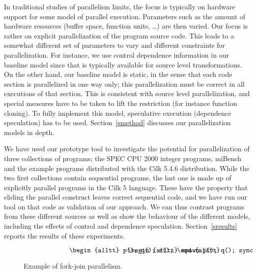 In traditional studies of parallelism limits, the focus is typically
on hardware support for some model of parallel execution. Parameters
such as the amount of hardware resources (buffer space, function
units, \ldots) are then varied. Our focus is rather on explicit
parallelization of the program source code. This leads to a somewhat
different set of parameters to vary and different constraints for
parallelization. For instance, we use control dependence information
in our baseline model since that is typically available for source
level transformations. On the other hand, our baseline model is
static, in the sense that each code section is parallelized in one way
only; this parallelization must be correct in all executions of that
section. This is consistent with source level parallelization, and
special measures have to be taken to lift the restriction (for
instance function cloning). To fully implement this model, speculative 
execution (dependence speculation) has to be used. Section~\ref{smethod} 
discusses our parallelization models in depth.

We have used our prototype tool to investigate the potential for 
parallelization of three collections of programs; the SPEC CPU 2000 
integer programs, miBench and the example programs distributed with
the Cilk 5.4.6 distribution. While the two first collections contain
sequential programs, the last one is made up of explicitly parallel 
programs in the Cilk 5 language. These have the property that eliding
the parallel construct leaves correct sequential code, and we have run 
our tool on that code as validation of our approach. We can thus contrast 
programs from these different sources as well as show the behaviour of 
the different models, including the effects of control and dependence speculation.
Section~\ref{sresults} reports the results of these experiments.




\begin{figure}
\small
\hrulefill
\[
\begin{minipage}[t]{3cm}
\begin{alltt}
   p();
   q();
   r();
\end{alltt}
\end{minipage}
\begin{minipage}[t]{3cm}
\begin{alltt}
   spawn p();
   q();
   sync;
   r();
\end{alltt}
\end{minipage} 
\]
\hrulefill
\caption{Example of fork-join parallelism.}
\label{fforkjoin}
\end{figure}

